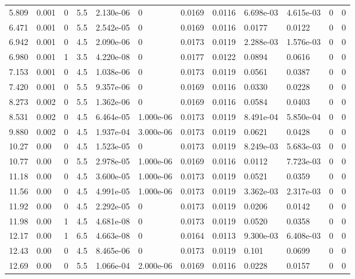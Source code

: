 \documentclass[preview]{standalone}
\begin{document}
{{\begin{tabular}{L{1.2cm}C{1.2cm} C{0.3cm}C{0.5cm} C{1.4cm}C{1.4cm} C{1.4cm}C{1.4cm} C{1.6cm}C{1.6cm} C{1.6cm}C{1.6cm}}
  5.809  &  0.001  & 0     & 5.5 &  2.130e-06  & 0  &  0.0169&   0.0116& 6.698e-03 & 4.615e-03   &  0 & 0  \\ 
  6.471  &  0.001  & 0     & 5.5 &  2.542e-05  & 0  &  0.0169&   0.0116& 0.0177 & 0.0122   &  0 & 0  \\ 
  6.942  &  0.001  & 0     & 4.5 &  2.090e-06  & 0  &  0.0173&   0.0119& 2.288e-03 & 1.576e-03   &  0 & 0  \\ 
  6.980  &  0.001  & 1     & 3.5 &  4.220e-08  & 0  &  0.0177&   0.0122& 0.0894 & 0.0616   &  0 & 0  \\ 
  7.153  &  0.001  & 0     & 4.5 &  1.038e-06  & 0  &  0.0173&   0.0119& 0.0561 & 0.0387   &  0 & 0  \\ 
  7.420  &  0.001  & 0     & 5.5 &  9.357e-06  & 0  &  0.0169&   0.0116& 0.0330 & 0.0228   &  0 & 0  \\ 
  8.273  &  0.002  & 0     & 5.5 &  1.362e-06  & 0  &  0.0169&   0.0116& 0.0584 & 0.0403   &  0 & 0  \\ 
  8.531  &  0.002  & 0     & 4.5 &  6.464e-05  & 1.000e-06  &  0.0173&   0.0119& 8.491e-04 & 5.850e-04   &  0 & 0  \\ 
  9.880  &  0.002  & 0     & 4.5 &  1.937e-04  & 3.000e-06  &  0.0173&   0.0119& 0.0621 & 0.0428   &  0 & 0  \\ 
  10.27  &  0.00  & 0     & 4.5 &  1.523e-05  & 0  &  0.0173&   0.0119& 8.249e-03 & 5.683e-03   &  0 & 0  \\ 
  10.77  &  0.00  & 0     & 5.5 &  2.978e-05  & 1.000e-06  &  0.0169&   0.0116& 0.0112 & 7.723e-03   &  0 & 0  \\ 
  11.18  &  0.00  & 0     & 4.5 &  3.600e-05  & 1.000e-06  &  0.0173&   0.0119& 0.0521 & 0.0359   &  0 & 0  \\ 
  11.56  &  0.00  & 0     & 4.5 &  4.991e-05  & 1.000e-06  &  0.0173&   0.0119& 3.362e-03 & 2.317e-03   &  0 & 0  \\ 
  11.92  &  0.00  & 0     & 4.5 &  2.292e-05  & 0  &  0.0173&   0.0119& 0.0206 & 0.0142   &  0 & 0  \\ 
  11.98  &  0.00  & 1     & 4.5 &  4.681e-08  & 0  &  0.0173&   0.0119& 0.0520 & 0.0358   &  0 & 0  \\ 
  12.17  &  0.00  & 1     & 6.5 &  4.663e-08  & 0  &  0.0164&   0.0113& 9.300e-03 & 6.408e-03   &  0 & 0  \\ 
  12.43  &  0.00  & 0     & 4.5 &  8.465e-06  & 0  &  0.0173&   0.0119& 0.101 & 0.0699   &  0 & 0  \\ 
  12.69  &  0.00  & 0     & 5.5 &  1.066e-04  & 2.000e-06  &  0.0169&   0.0116& 0.0228 & 0.0157   &  0 & 0  \\ 

\end{tabular}}}
\end{document}
